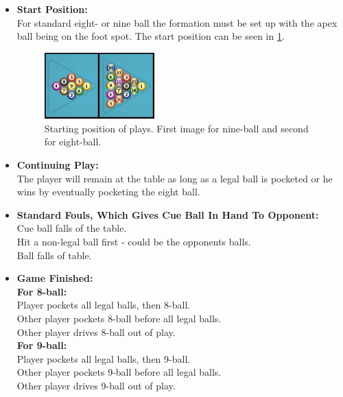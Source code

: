 \begin{itemize}
	\item \textbf{Start Position:}\\
		For standard eight- or nine ball the formation must be set up with the apex ball being on the foot spot. The start position can be seen in \ref{fig:poolstart}.\\
		
\begin{figure}[htpb]
\begin{center}
\leavevmode
\includegraphics[width=0.4\textwidth]{images/poolstart.jpg}
\end{center}
\caption{Starting position of plays. First image for nine-ball and second for eight-ball.}
\label{fig:poolstart}
\end{figure}

	\item \textbf{Continuing Play:}\\
		The player will remain at the table as long as a legal ball is pocketed or he wins by eventually pocketing the eight ball.\\
		
	\item \textbf{Standard Fouls, Which Gives Cue Ball In Hand To Opponent:}\\
		Cue ball falls of the table.\\
		Hit a non-legal ball first - could be the opponents balls.\\
		Ball falls of table.\\
		
	\item \textbf{Game Finished:}\\
		\textbf{For 8-ball:}\\
		\hspace*{10 mm}Player pockets all legal balls, then 8-ball.\\
		\hspace*{10 mm}Other player pockets 8-ball before all legal balls.\\
		\hspace*{10 mm}Other player drives 8-ball out of play.\\
		\textbf{For 9-ball:}\\
		\hspace*{10 mm}Player pockets all legal balls, then 9-ball.\\
		\hspace*{10 mm}Other player pockets 9-ball before all legal balls.\\
		\hspace*{10 mm}Other player drives 9-ball out of play.\\
\end{itemize}

